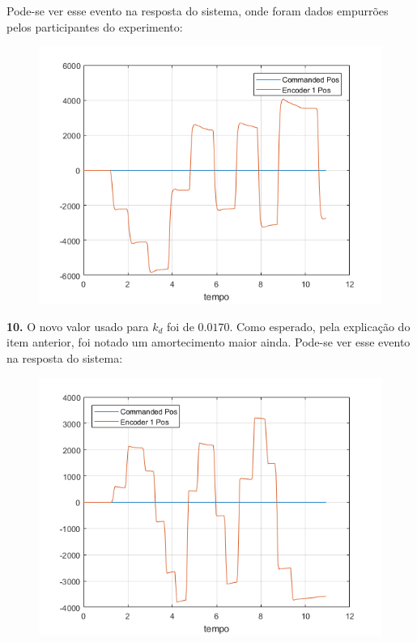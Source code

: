 \documentclass[a4paper,11pt]{article}
\begin{document}
Pode-se ver esse evento na resposta do sistema, onde foram dados empurrões pelos
participantes do experimento:

\begin{figure}[H]
\includegraphics{q09}
\centering
\end{figure}

\textbf{10.}
O novo valor usado para $k_d$ foi de $0.0170$. Como esperado, pela explicação do
item anterior, foi notado um amortecimento maior ainda. Pode-se ver esse evento
na resposta do sistema:

\begin{figure}[H]
\includegraphics{q10}
\centering
\end{figure}
\end{document}
